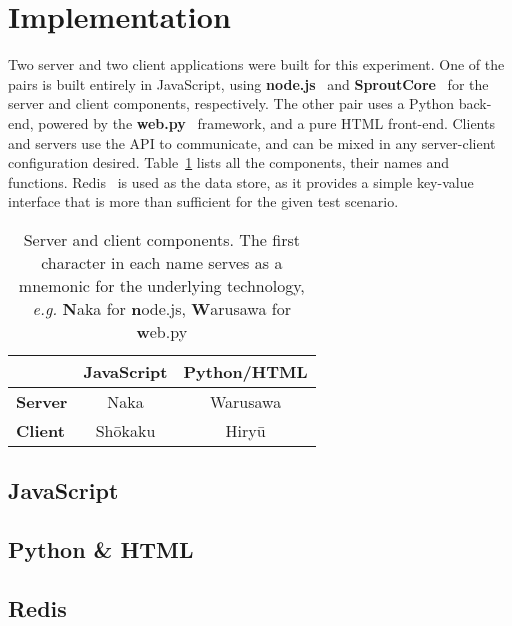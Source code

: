 \section{\label{sec:impl}Implementation}

Two server and two client applications were built for this experiment. One of the pairs is built entirely in JavaScript, using \textbf{node.js}~\cite{node} and \textbf{SproutCore}~\cite{sprout} for the server and client components, respectively. The other pair uses a Python back-end, powered by the \textbf{web.py}~\cite{webpy} framework, and a pure HTML front-end. Clients and servers use the API to communicate, and can be mixed in any server-client configuration desired. Table~\ref{tab:comps} lists all the components, their names and functions. Redis~\cite{redis} is used as the data store, as it provides a simple key-value interface that is more than sufficient for the given test scenario.

\begin{table}
    \begin{center}
        \begin{tabular}{l c c}
            \toprule
            & \textbf{JavaScript} & \textbf{Python/HTML} \\
            \midrule
            \textbf{Server} & Naka & Warusawa \\
            \textbf{Client} & Sh\={o}kaku & Hiry\={u}\\
            \bottomrule
        \end{tabular}
        \caption{Server and client components. The first character in each name serves as a mnemonic for the underlying technology, \emph{e.g.} \textbf{N}aka for \textbf{n}ode.js, \textbf{W}arusawa for \textbf{w}eb.py}
        \label{tab:comps}
    \end{center}
\end{table}

\subsection{\label{sec:impl:js}JavaScript}

\subsection{\label{sec:impl:pyhtml}Python \& HTML}

\subsection{\label{sec:impl:redis}Redis}
